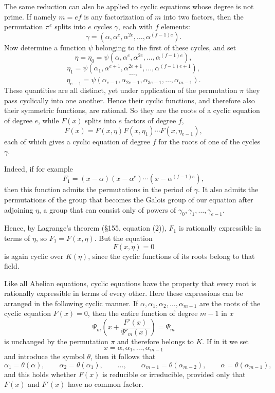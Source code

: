 \documentclass[11pt]{article}
\begin{document}
The same reduction can also be applied to cyclic equations whose degree is not prime. If namely $m=ef$ is any factorization of $m$ into two factors, then the permutation $\pi^e$ splits into $e$ cycles $\gamma$, each with $f$ elements:
\[
\gamma=(\alpha,\alpha^e,\alpha^{2e},\dots,\alpha^{(f-1)e}).
\tag{9}
\]
Now determine a function $\psi$ belonging to the first of these cycles, and set
\[
\eta=\eta_0=\psi(\alpha,\alpha^e,\alpha^{2e},\dots,\alpha^{(f-1)e}),
\]
\[
\eta_1=\psi(\alpha_1,\alpha^{e+1},\alpha^{2e+1},\dots,\alpha^{(f-1)e+1}),
\]
\[
\dots,
\]
\[
\eta_{e-1}=\psi(\alpha_{e-1},\alpha_{2e-1},\alpha_{3e-1},\dots,\alpha_{m-1}).
\tag{10}
\]
These quantities are all distinct, yet under application of the permutation $\pi$ they pass cyclically into one another. Hence their cyclic functions, and therefore also their symmetric functions, are rational. So they are the roots of a cyclic equation of degree $e$, while $F(x)$ splits into $e$ factors of degree $f$,
\[
F(x)=F(x,\eta)F(x,\eta_1)\cdots F(x,\eta_{e-1}),
\]
each of which gives a cyclic equation of degree $f$ for the roots of one of the cycles $\gamma$.

Indeed, if for example
\[
F_1=(x-\alpha)(x-\alpha^e)\cdots(x-\alpha^{(f-1)e}),
\]
then this function admits the permutations in the period of $\gamma$. It also admits the permutations of the group that becomes the Galois group of our equation after adjoining $\eta$, a group that can consist only of powers of $\gamma_0,\gamma_1,\dots,\gamma_{e-1}$.

Hence, by Lagrange's theorem (\S 155, equation (2)), $F_1$ is rationally expressible in terms of $\eta$, so $F_1=F(x,\eta)$. But the equation
\[
F(x,\eta)=0
\]
is again cyclic over $K(\eta)$, since the cyclic functions of its roots belong to that field.

Like all Abelian equations, cyclic equations have the property that every root is rationally expressible in terms of every other. Here these expressions can be arranged in the following cyclic manner. If $\alpha,\alpha_1,\alpha_2,\dots,\alpha_{m-1}$ are the roots of the cyclic equation $F(x)=0$, then the entire function of degree $m-1$ in $x$
\[
\Psi_m\!\left(x+\frac{F'(x)}{\Psi'_m(x)}\right)=\Psi_m
\]
is unchanged by the permutation $\pi$ and therefore belongs to $K$. If in it we set
\[
x=\alpha,\alpha_1,\dots,\alpha_{m-1}
\]
and introduce the symbol $\theta$, then it follows that
\[
\alpha_1=\theta(\alpha),\qquad
\alpha_2=\theta(\alpha_1),\qquad
\dots,\qquad
\alpha_{m-1}=\theta(\alpha_{m-2}),\qquad
\alpha=\theta(\alpha_{m-1}),
\tag{11}
\]
and this holds whether $F(x)$ is reducible or irreducible, provided only that $F(x)$ and $F'(x)$ have no common factor.
\end{document}
